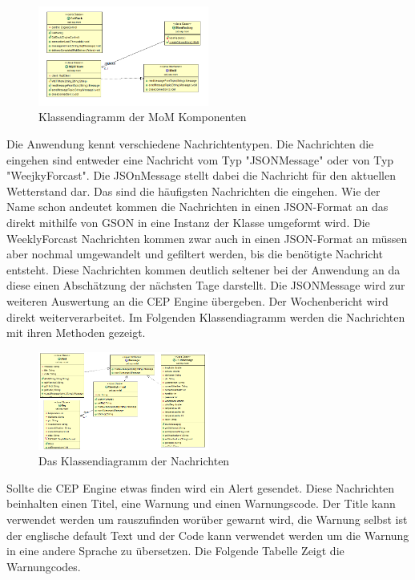 \begin{figure}[htbp]
	\centering
	\includegraphics[width=0.5\textwidth]{Bilder/MoMKomponents.png}
	\caption{Klassendiagramm der MoM Komponenten}
	\label{img:MoMDiagramm}
\end{figure} 
Die Anwendung kennt verschiedene Nachrichtentypen. Die Nachrichten die eingehen sind entweder eine Nachricht vom Typ "JSONMessage" oder von Typ "WeejkyForcast". Die JSOnMessage stellt dabei die Nachricht für den aktuellen Wetterstand dar. Das sind die häufigsten Nachrichten die eingehen. Wie der Name schon andeutet kommen die Nachrichten in einen JSON-Format an das direkt mithilfe von GSON in eine Instanz der Klasse umgeformt wird. Die WeeklyForcast Nachrichten kommen zwar auch in einen JSON-Format an müssen aber nochmal umgewandelt und gefiltert werden, bis die benötigte Nachricht entsteht. Diese Nachrichten kommen deutlich seltener bei der Anwendung an da diese einen Abschätzung der nächsten Tage darstellt. Die JSONMessage wird zur weiteren Auswertung an die CEP Engine übergeben. Der Wochenbericht wird direkt weiterverarbeitet. Im Folgenden Klassendiagramm werden die Nachrichten mit ihren Methoden gezeigt. 
\begin{figure}[htbp]
	\centering
	\includegraphics[width=0.5\textwidth]{Bilder/News.png}
	\caption{Das Klassendiagramm der Nachrichten}
	\label{img:eventDiagramm}
\end{figure} 
Sollte die CEP Engine etwas finden wird ein Alert gesendet. Diese Nachrichten beinhalten einen Titel, eine Warnung und einen Warnungscode. Der Title kann verwendet werden um rauszufinden worüber gewarnt wird, die Warnung selbst ist der englische default Text und der Code kann verwendet werden um die Warnung in eine andere Sprache zu übersetzen.  Die Folgende Tabelle Zeigt die Warnungcodes. 
